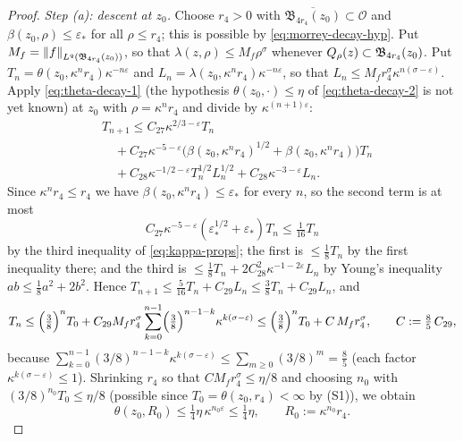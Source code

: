 \documentclass[11pt,reqno]{amsart}
\begin{document}
\begin{proof}
\emph{Step (a): descent at $z_{0}$.} Choose $r_{4}>0$ with
$\overline{\mathfrak{B}_{4r_{4}}(z_{0})}\subset\mathcal{O}$ and
$\beta(z_{0},\rho)\le\varepsilon_{*}$ for all $\rho\le r_{4}$; this is possible
by \eqref{eq:morrey-decay-hyp}. Put $M_{f}=\left\lVert f \right\rVert_{L^{q}(\mathfrak{B}_{4r_{4}}(z_{0}))}$,
so that $\lambda(z,\rho)\le M_{f}\rho^{\sigma}$ whenever
$Q_{\rho}(z)\subset\mathfrak{B}_{4r_{4}}(z_{0})$. Put $T_{n}=\theta(z_{0},\kappa^{n}r_{4})\kappa^{-n\varepsilon}$ and
$L_{n}=\lambda(z_{0},\kappa^{n}r_{4})\kappa^{-n\varepsilon}$, so that
$L_{n}\le M_{f}r_{4}^{\sigma}\kappa^{n(\sigma-\varepsilon)}$. Apply
\eqref{eq:theta-decay-1} (the hypothesis
$\theta(z_{0},\cdot)\le\eta$ of \eqref{eq:theta-decay-2} is not yet known) at $z_{0}$ with
$\rho=\kappa^{n}r_{4}$ and divide by $\kappa^{(n+1)\varepsilon}$:
\[\begin{aligned}
  &T_{n+1}\le C_{27}\kappa^{2/3-\varepsilon}T_{n}
   \\ &\quad+C_{27}\kappa^{-5-\varepsilon}
     \bigl(\beta(z_{0},\kappa^{n}r_{4})^{1/2}+\beta(z_{0},\kappa^{n}r_{4})\bigr)T_{n}
   \\ &\quad+C_{28}\kappa^{-1/2-\varepsilon}T_{n}^{1/2}L_{n}^{1/2}
   +C_{28}\kappa^{-3-\varepsilon}L_{n}.
\end{aligned}\]
Since $\kappa^{n}r_{4}\le r_{4}$ we have $\beta(z_{0},\kappa^{n}r_{4})\le\varepsilon_{*}$
for every $n$, so the second term is at most
\[
C_{27}\kappa^{-5-\varepsilon}(\varepsilon_{*}^{1/2}+\varepsilon_{*})T_{n}
 \le\tfrac1{16}T_{n}
\]
 by the third inequality of \eqref{eq:kappa-props}; the
first is $\le\tfrac18T_{n}$ by the first inequality there; and the third is
$\le\tfrac18T_{n}+2C_{28}^{2}\kappa^{-1-2\varepsilon}L_{n}$ by Young's
inequality $ab\le\tfrac18a^{2}+2b^{2}$. Hence
$T_{n+1}\le\tfrac5{16}T_{n}+C_{29}L_{n}\le\tfrac38T_{n}+C_{29}L_{n}$, and
\[
  T_{n}\le\Bigl(\tfrac38\Bigr)^{n}T_{0}
   +C_{29}M_{f}r_{4}^{\sigma}\sum_{k=0}^{n-1}\Bigl(\tfrac38\Bigr)^{n-1-k}
     \kappa^{k(\sigma-\varepsilon)}
  \le\Bigl(\tfrac38\Bigr)^{n}T_{0}+C\,M_{f}r_{4}^{\sigma},
  \qquad C:=\tfrac85\,C_{29},
\]
because $\sum_{k=0}^{n-1}(3/8)^{n-1-k}\kappa^{k(\sigma-\varepsilon)}
 \le\sum_{m\ge0}(3/8)^{m}=\tfrac85$ (each factor $\kappa^{k(\sigma-\varepsilon)}\le1$). Shrinking
$r_{4}$ so that $C M_{f}r_{4}^{\sigma}\le\eta/8$ and choosing $n_{0}$ with
$(3/8)^{n_{0}}T_{0}\le\eta/8$ (possible since $T_{0}=\theta(z_{0},r_{4})<\infty$
by (S1)), we obtain
\begin{equation}\label{eq:descent}
  \theta(z_{0},R_{0})\le\tfrac14\eta\,\kappa^{n_{0}\varepsilon}\le\tfrac14\eta,
  \qquad R_{0}:=\kappa^{n_{0}}r_{4}.
\end{equation}


\end{proof}
\end{document}
